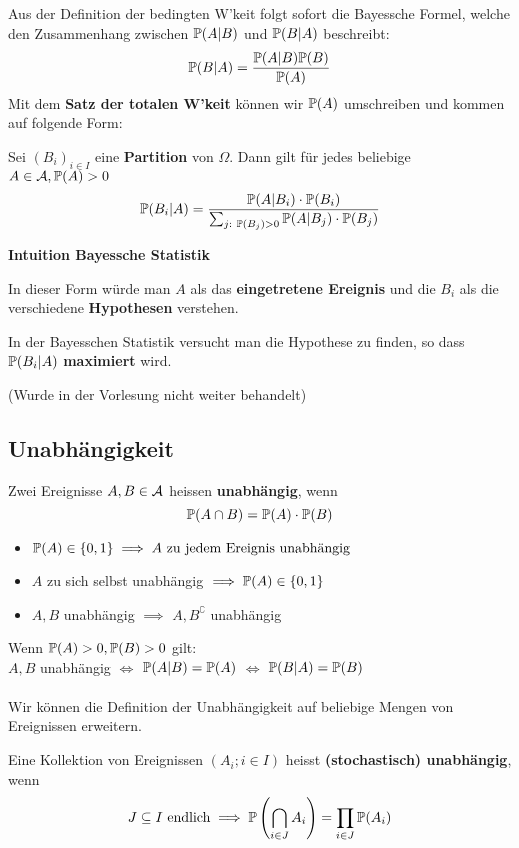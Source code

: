 Aus der Definition der bedingten W'keit folgt sofort die Bayessche Formel, welche den Zusammenhang zwischen $\P(A|B)$ und $\P(B|A)$ beschreibt:
$$\P(B|A) = \frac{\P(A|B)\P(B)}{\P(A)}$$
Mit dem \textbf{Satz der totalen W'keit} können wir $\P(A)$ umschreiben und kommen auf folgende Form:

Sei $(B_i)_{i\in I}$ eine \textbf{Partition} von $\Omega$. Dann gilt für jedes beliebige $A \in \A, \P(A) > 0$
$$\P(B_i|A) = \frac{\P(A|B_i)\cdot\P(B_i)}{\sum_{j:\ \P(B_j)>0}\P(A|B_j)\cdot \P(B_j)}$$

\textbf{Intuition Bayessche Statistik}

In dieser Form würde man $A$ als das \textbf{eingetretene Ereignis} und die $B_i$ als die verschiedene \textbf{Hypothesen} verstehen. 

In der Bayesschen Statistik versucht man die Hypothese zu finden, so dass $\P(B_i|A)$ \textbf{maximiert} wird.

(Wurde in der Vorlesung nicht weiter behandelt)
\subsection{Unabhängigkeit} 
\begin{mainbox}{}
    Zwei Ereignisse $A, B \in \A$ heissen \textbf{unabhängig}, wenn 
    $$\P(A\cap B) = \P(A) \cdot \P(B)$$
\end{mainbox}
\begin{itemize}
    \item $\P(A) \in \{0, 1\} \implies A \text{ zu jedem Ereignis unabhängig}$
    \item $A$ zu sich selbst unabhängig $\implies \P(A) \in \{0,1\}$
    \item $A, B$ unabhängig $\implies$ $A, B^\complement$ unabhängig
\end{itemize}
Wenn $\P(A) > 0, \P(B) > 0$ gilt:\\
 $A,B$ unabhängig $\iff$ $\P(A|B)=\P(A)$ $\iff$ $\P(B|A)=\P(B)$
\\
\\
Wir können die Definition der Unabhängigkeit auf beliebige Mengen von Ereignissen erweitern.
\begin{mainbox}{}
    Eine Kollektion von Ereignissen $(A_i; i \in I)$ heisst \textbf{(stochastisch) unabhängig}, wenn 
    $$J \subseteq I \text{ endlich} \implies \P\left(\bigcap_{i\in J} A_i\right) = \prod_{i \in J} \P(A_i)$$
\end{mainbox}

